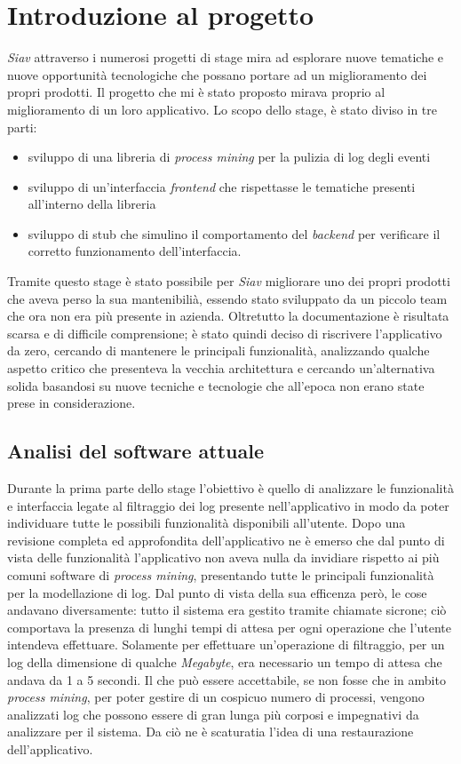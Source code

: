 \section{Introduzione al progetto}
\textit{Siav} attraverso i numerosi progetti di stage mira ad esplorare nuove tematiche e nuove opportunità tecnologiche che possano portare ad un miglioramento dei propri prodotti. Il progetto che mi è stato proposto mirava proprio al miglioramento di un loro applicativo. Lo scopo dello stage, è stato diviso in tre parti:
\begin{itemize}
	\item sviluppo di una libreria di \textit{process mining} per la pulizia di log degli eventi
	\item sviluppo di un'interfaccia \textit{frontend} che rispettasse le tematiche presenti all'interno della libreria
	\item sviluppo di \gls{stub} che simulino il comportamento del \textit{backend} per verificare il corretto funzionamento dell'interfaccia.
\end{itemize}
Tramite questo stage è stato possibile per \textit{Siav} migliorare uno dei propri prodotti che aveva perso la sua mantenibilià, essendo stato sviluppato da un piccolo team che ora non era più presente in azienda. Oltretutto la documentazione è risultata scarsa e di difficile comprensione; è stato quindi deciso di riscrivere l'applicativo da zero, cercando di mantenere le principali funzionalità, analizzando qualche aspetto critico che presenteva la vecchia architettura e cercando un'alternativa solida basandosi su nuove tecniche e tecnologie che all'epoca non erano state prese in considerazione. 
\subsection{Analisi del software attuale}
Durante la prima parte dello stage l'obiettivo è quello di analizzare le funzionalità e interfaccia legate al filtraggio dei log presente nell'applicativo in modo da poter individuare tutte le possibili funzionalità disponibili all'utente. Dopo una revisione completa ed approfondita dell'applicativo ne è emerso che dal punto di vista delle funzionalità l'applicativo non aveva nulla da invidiare rispetto ai più comuni software di \textit{process mining}, presentando tutte le principali funzionalità per la modellazione di log. Dal punto di vista della sua efficenza però, le cose andavano diversamente: tutto il sistema era gestito tramite chiamate sicrone; ciò comportava la presenza di lunghi tempi di attesa per ogni operazione che l'utente intendeva effettuare. Solamente per effettuare un'operazione di filtraggio, per un log della dimensione di qualche \textit{Megabyte}, era necessario un tempo di attesa che andava da 1 a 5 secondi. Il che può essere accettabile, se non fosse che in ambito \textit{process mining}, per poter gestire di un cospicuo numero di processi, vengono analizzati log che possono essere di gran lunga più corposi e impegnativi da analizzare per il sistema. Da ciò ne è scaturatia l'idea di una restaurazione dell'applicativo.

